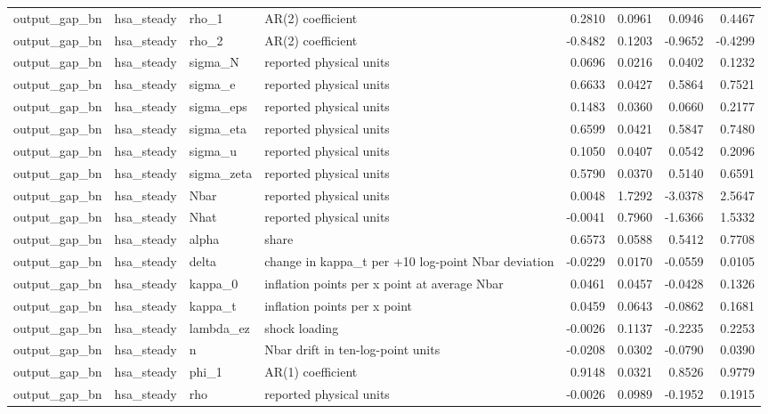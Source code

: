 \begin{tabular}{llllrrrr}
output\_gap\_bn & hsa\_steady & rho\_1 & AR(2) coefficient & 0.2810 & 0.0961 & 0.0946 & 0.4467 \\
output\_gap\_bn & hsa\_steady & rho\_2 & AR(2) coefficient & -0.8482 & 0.1203 & -0.9652 & -0.4299 \\
output\_gap\_bn & hsa\_steady & sigma\_N & reported physical units & 0.0696 & 0.0216 & 0.0402 & 0.1232 \\
output\_gap\_bn & hsa\_steady & sigma\_e & reported physical units & 0.6633 & 0.0427 & 0.5864 & 0.7521 \\
output\_gap\_bn & hsa\_steady & sigma\_eps & reported physical units & 0.1483 & 0.0360 & 0.0660 & 0.2177 \\
output\_gap\_bn & hsa\_steady & sigma\_eta & reported physical units & 0.6599 & 0.0421 & 0.5847 & 0.7480 \\
output\_gap\_bn & hsa\_steady & sigma\_u & reported physical units & 0.1050 & 0.0407 & 0.0542 & 0.2096 \\
output\_gap\_bn & hsa\_steady & sigma\_zeta & reported physical units & 0.5790 & 0.0370 & 0.5140 & 0.6591 \\
output\_gap\_bn & hsa\_steady & Nbar & reported physical units & 0.0048 & 1.7292 & -3.0378 & 2.5647 \\
output\_gap\_bn & hsa\_steady & Nhat & reported physical units & -0.0041 & 0.7960 & -1.6366 & 1.5332 \\
output\_gap\_bn & hsa\_steady & alpha & share & 0.6573 & 0.0588 & 0.5412 & 0.7708 \\
output\_gap\_bn & hsa\_steady & delta & change in kappa\_t per +10 log-point Nbar deviation & -0.0229 & 0.0170 & -0.0559 & 0.0105 \\
output\_gap\_bn & hsa\_steady & kappa\_0 & inflation points per x point at average Nbar & 0.0461 & 0.0457 & -0.0428 & 0.1326 \\
output\_gap\_bn & hsa\_steady & kappa\_t & inflation points per x point & 0.0459 & 0.0643 & -0.0862 & 0.1681 \\
output\_gap\_bn & hsa\_steady & lambda\_ez & shock loading & -0.0026 & 0.1137 & -0.2235 & 0.2253 \\
output\_gap\_bn & hsa\_steady & n & Nbar drift in ten-log-point units & -0.0208 & 0.0302 & -0.0790 & 0.0390 \\
output\_gap\_bn & hsa\_steady & phi\_1 & AR(1) coefficient & 0.9148 & 0.0321 & 0.8526 & 0.9779 \\
output\_gap\_bn & hsa\_steady & rho & reported physical units & -0.0026 & 0.0989 & -0.1952 & 0.1915 \\

\end{tabular}
